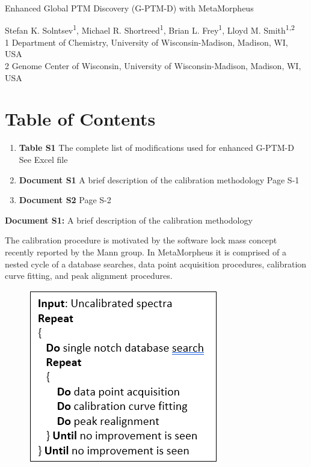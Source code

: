 \documentclass{article}
\begin{document}
	

{\Huge Enhanced Global PTM Discovery (G-PTM-D) with MetaMorpheus}

{\Large Stefan K. Solntsev\textsuperscript{1}, Michael R. Shortreed\textsuperscript{1}, Brian L. Frey\textsuperscript{1}, Lloyd M. Smith\textsuperscript{1,2}}\\
{\footnotesize 1 Department of Chemistry, University of Wisconsin-Madison, Madison, WI, USA}\\
{\footnotesize 2 Genome Center of Wisconsin, University of Wisconsin-Madison, Madison, WI, USA}\\

\section{Table of Contents}


\begin{enumerate}
\item \textbf{Table S1} The complete list of modifications used for enhanced G-PTM-D\\
      See Excel file
\item \textbf{Document S1}   A brief description of the calibration methodology      \hfill      Page S-1
\item \textbf{Document S2}         \hfill      Page S-2
\end{enumerate}

\newpage

{\huge \textbf{Document S1:} A brief description of the calibration methodology}

The calibration procedure is motivated by the software lock mass concept recently reported by the Mann group. 
In MetaMorpheus it is comprised of a nested cycle of a database searches, data point acquisition procedures, calibration curve fitting, and peak alignment procedures. 

\begin{figure}[ht]
\includegraphics{supFig1.png}
\end{figure}
\end{document}
